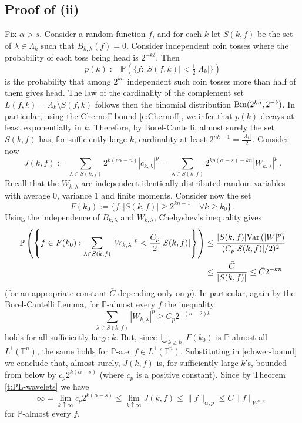 \documentclass[11pt,reqno]{amsart}
\theoremstyle{definition}
\numberwithin{equation}{section}
\begin{document}
\subsection{Proof of (ii)} Fix $\alpha > s$. Consider a random function $f$, and for each $k$ let $S(k, f)$ be the set of $\lambda \in \Lambda_k$ such that $B_{k, \lambda} (f)=0$. Consider independent coin tosses where the probability of each toss being head is $2^{-k\delta}$. Then 
\[
p (k) := \mathbb P \left(\{f: |S(f,k)|< \tfrac{1}{2} |\Lambda_k|\}\right)
\]
is the probability that among $2^{kn}$ independent such coin tosses more than half of them gives head. The law of the cardinality of the complement set $L (f,k) = \Lambda_k \setminus S(f,k)$ follows then the binomial distribution ${\rm Bin} (2^{kn}, 2^{-\delta})$. In particular, using the Chernoff bound \eqref{e:Chernoff}, we infer that $p(k)$ decays at least exponentially in $k$. 
Therefore, by Borel-Cantelli, almost surely the set $S(k,f)$ has, for sufficiently large $k$, cardinality at least $2^{nk-1} = \frac{|\Lambda_k|}{2}$. Consider now 
\begin{equation}\label{e:lower-bound}
J (k,f) := \sum_{\lambda \in S(k,f)} 2^{k(p \alpha-n)} |c_{k,\lambda}|^p = \sum_{\lambda\in S(k,f)} 2^{kp (\alpha-s) -kn} |W_{k,\lambda}|^p\, .
\end{equation}
Recall that the $W_{k,\lambda}$ are independent identically distributed random variables with average $0$, variance $1$ and finite moments. Consider now the set 
\[
F (k_0) := \{f: |S(k,f)|\geq 2^{kn-1} \quad \forall k \geq k_0\}\, . 
\]
Using the independence of $B_{k,\lambda}$ and $W_{k, \lambda}$, Chebyshev's inequality gives  
\begin{align}
\mathbb P \left(  \left\{ f\in F(k_0) : \sum_{\lambda \in S (k,f)} |W_{k,\lambda}|^p < \frac{C_p}{2} |S (k,f)| \right\} \right) &\leq \frac{|S (k,f)| {\rm Var}\, (|W|^p)}{(C_p|S (k,f)|/2)^2} \label{e:Chebyshev}\\
&\leq \frac{\bar{C}}{|S (k,f)|} \leq \bar{C} 2^{-kn}\nonumber
\end{align}
(for an appropriate constant $\bar{C}$ depending only on $p$). 
In particular, again by the Borel-Cantelli Lemma, for $\mathbb P$-almost every $f$ the inequality
\[
 \sum_{\lambda \in S (k,f)} |W_{k,\lambda}|^p \geq C_p 2^{-(n-2)k}
\]
holds for all sufficiently large $k$. But, since $\bigcup_{k\geq k_0} F(k_0)$ is $\mathbb P$-almost all $L^1 (\mathbb T^n)$, the same holds for $\mathbb P$-a.e. $f\in L^1 (\mathbb T^n)$. Substituting in \eqref{e:lower-bound} we conclude that, almost surely, $J (k,f)$ is, for sufficiently large $k$'s, bounded from below by $c_p 2^{k (\alpha -s)}$ (where $c_p$ is a positive constant). Since by Theorem \ref{t:PL-wavelets} we have 
\[
\infty = \lim_{k\uparrow \infty} c_p 2^{k(\alpha-s)} \leq \lim_{k\uparrow \infty} J (k,f) \leq \|f\|_{\alpha, p} \leq C \|f\|_{W^{\alpha, p}}\, 
\]
for $\mathbb P$-almost every $f$.
\end{document}
